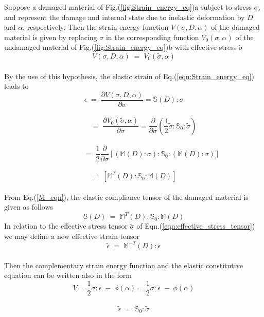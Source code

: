 \documentclass[a4paper,12pt]{extarticle}
\begin{document}
Suppose a damaged material of Fig.(\ref{fig:Strain_energy_eq})a subject to stress $\sigma$, and represent the damage and internal state due to inelastic deformation by $D$ and $\alpha$, respectively. Then the strain energy function $V(\sigma,D,\alpha)$ of the damaged material is given by replacing $\sigma$ in the corresponding function $V_{0}(\sigma,\alpha)$ of the undamaged material of Fig.(\ref{fig:Strain_energy_eq})b with effective stress $\tilde{\sigma}$
\\
\begin{equation*}
V(\sigma,D,\alpha) \; = \; V_{0}(\tilde{\sigma},\alpha)
\end{equation*}
\\
By the use of this hypothesis, the elastic strain of Eq.(\ref{eqn:Strain_energy_eq}) leads to
\\
\begin{equation*}
\epsilon \; = \; \frac{\partial V(\sigma,D,\alpha)}{\partial \sigma} = \mathbb{S}(D) : \sigma 
\end{equation*}
\\
\begin{equation*}
\;\;\;\;\;\;\;\;\;\; = \; \frac{\partial V_{0}(\tilde{\sigma},\alpha)}{\partial \sigma} = \frac{\partial}{\partial \sigma}(\frac{1}{2}\tilde{\sigma} : \mathbb{S}_{0} : \tilde{\sigma} )
\end{equation*}
\\
\begin{equation*}
\;\;\;\;\;\;\;\;\;\;\;\;\;\;\;\;\;\; = \; \frac{1}{2}\frac{\partial}{\partial \sigma} [(\mathbb{M}(D):\sigma) : \mathbb{S}_{0} : (\mathbb{M}(D):\sigma)]
\end{equation*}
\\
\begin{equation}
= \;[\mathbb{M}^{T}(D) : \mathbb{S}_{0} : \mathbb{M}(D)]
\label{M_eqn}
\end{equation}
\\
From Eq.(\ref{M_eqn}), the elastic compliance tensor of the damaged material is given as follows
\\
\begin{equation}
\mathbb{S}(D) \; = \; \mathbb{M}^{T}(D) : \mathbb{S}_{0} : \mathbb{M}(D)
\label{eqn: S_HSEeq}
\end{equation}
In relation to the effective stress tensor $\tilde{\sigma}$ of Eqn.(\ref{eqn:effective_stress_tensor}) we may define a new effective strain tensor
\\
\begin{equation}
\tilde{\epsilon} \; = \; \mathbb{M}^{-T}(D) : \epsilon
\end{equation}
\\
Then the complementary strain energy function and the elastic constitutive equation can be written also in the form
\\
\begin{equation}
V = \frac{1}{2}\sigma : \epsilon \; - \; \phi(\alpha) = \frac{1}{2}\tilde{\sigma} : \tilde{\epsilon} \; - \; \phi(\alpha)
\end{equation}
\\
\begin{equation}
\tilde{\epsilon} \; = \; \mathbb{S}_{0} : \tilde{\sigma}
\end{equation}
\end{document}
